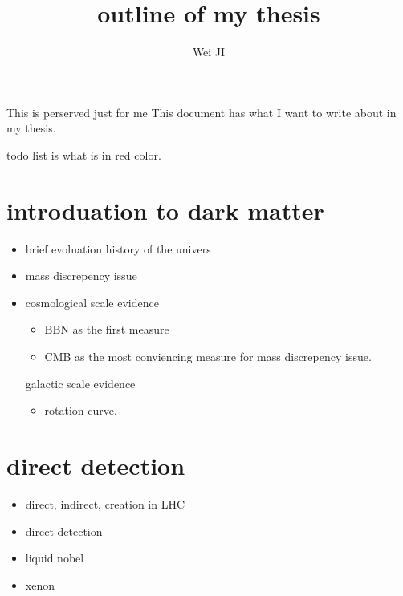 \documentclass{report}
\begin{document}
	\title{outline of my thesis}
	\author{Wei JI}
	
	\maketitle
	This is perserved just for me This document has what I want to write about in my thesis. 
	
	todo list is what is in red color.

\chapter{introduation to dark matter}
\begin{itemize}
	\item brief evoluation history of the univers
	\item mass discrepency issue
	\item cosmological scale evidence
	\begin{itemize}
		\item BBN as the first measure
		\item CMB as the most conviencing measure for mass  discrepency issue. 		
	\end{itemize}
		galactic scale evidence
	\begin{itemize}
	\item rotation curve.
	\end{itemize}
\end{itemize}
\chapter{direct detection}

\begin{itemize}
	\item direct, indirect, creation in LHC
	\item direct detection
	\item liquid nobel
	\item xenon
\end{itemize}
\end{document}
